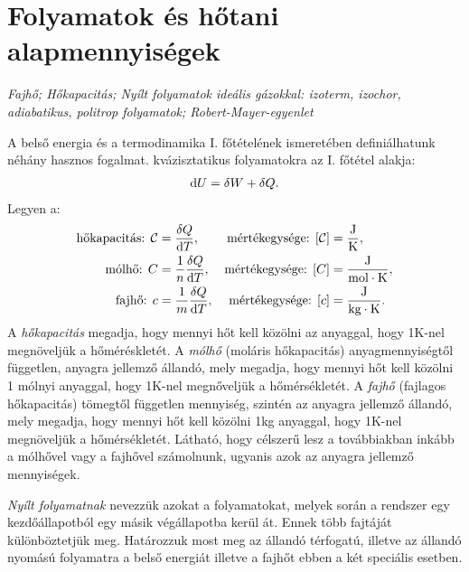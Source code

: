 \section{Folyamatok és hőtani alapmennyiségek}
\emph{Fajhő; Hőkapacitás; Nyílt folyamatok ideális gázokkal: izoterm, izochor, adiabatikus, politrop folyamatok; Robert-Mayer-egyenlet}

A belső energia és a termodinamika I. főtételének ismeretében definiálhatunk néhány hasznos fogalmat. kvázisztatikus folyamatokra az I. főtétel alakja:
\begin{align}
    \mathrm{d}U = \delta W + \delta Q.
\end{align}
Legyen a:
\begin{align}
    \textnormal{hőkapacitás: }\mathcal C &= \frac{\delta Q}{\mathrm{d}T}, &\textnormal{mértékegysége: } [\mathcal C] &= \frac{\textnormal{J}}{\textnormal{K}},\\
    \textnormal{mólhő: } C &= \frac{1}{n} \frac{\delta Q}{\mathrm{d}T},  &\textnormal{mértékegysége: } [C] &= \frac{\textnormal{J}}{\textnormal{mol}\cdot \textnormal{K}},\\
    \textnormal{fajhő: }c &= \frac{1}{m} \frac{\delta Q}{\mathrm{d}T}, &\textnormal{mértékegysége: } [c] &= \frac{\textnormal{J}}{\textnormal{kg}\cdot \textnormal{K}}.
\end{align}
A \emph{hőkapacitás} megadja, hogy mennyi hőt kell közölni az anyaggal, hogy 1K-nel megnöveljük a hőméréskletét. A \emph{mólhő} (moláris hőkapacitás) anyagmennyiségtől független, anyagra jellemző állandó, mely megadja, hogy mennyi hőt kell közölni 1 mólnyi anyaggal, hogy 1K-nel megnőveljük a hőmérsékletét. A \emph{fajhő} (fajlagos hőkapacitás) tömegtől független mennyiség, szintén az anyagra jellemző állandó, mely megadja, hogy mennyi hőt kell közölni 1kg anyaggal, hogy 1K-nel megnöveljük a hőmérsékletét. Látható, hogy célszerű lesz a továbbiakban inkább a mólhővel vagy a fajhővel számolnunk, ugyanis azok az anyagra jellemző mennyiségek.

\emph{Nyílt folyamatnak} nevezzük azokat a folyamatokat, melyek során a rendszer egy kezdőállapotból egy másik végállapotba kerül át. Ennek több fajtáját különböztetjük meg. Határozzuk most meg az állandó térfogatú, illetve az állandó nyomású folyamatra a belső energiát illetve a fajhőt ebben a két speciális esetben.

